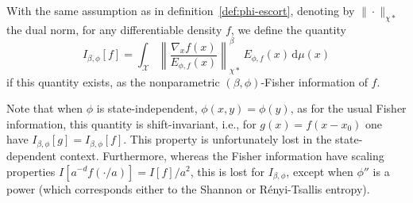 \documentclass[entropy,article,submit,moreauthors,pdftex]{Definitions/mdpi}
\def\dmu{\mathrm{d}\mu}%
\def\X{\mathcal{X}}%
\begin{document}
\begin{Definition}
\label{def:np-phi-Fisher}
%
  With the  same assumption  as in definition~\ref{def:phi-escort},  denoting by
  $\| \cdot  \|_{\chi*}$ the dual norm,  for any differentiable density  $f$, we
  define the quantity
  \begin{equation}\label{eq:np-phi-Fisher}
  I_{\beta,\phi}[f] = \int_\X \left\| \frac{\nabla_x f(x)}{E_{\phi,f}(x)}
    \right\|_{\chi*}^\beta \, E_{\phi,f}(x) \, \dmu(x)
  \end{equation}
  if   this  quantity   exists,  as   the   nonparametric  $(\beta,\phi)$-Fisher
  information of $f$.
\end{Definition}
%
Note that  when $\phi$ is state-independent,  $\phi(x,y) = \phi(y)$, as  for the
usual Fisher  information, this quantity  is shift-invariant, i.e., for  $g(x) =
f(x-x_0)$  one have  $I_{\beta,\phi}[g] =  I_{\beta,\phi}[f]$. This  property is
unfortunately  lost in  the  state-dependent context.  Furthermore, whereas  the
Fisher information  have scaling  properties $I[a^{-d} f(\cdot/a)]  = I[f]/a^2$,
this  is lost  for  $I_{\beta,\phi}$, except  when $\phi''$  is  a power  (which
corresponds either to the Shannon or R\'enyi-Tsallis entropy).
\end{document}
